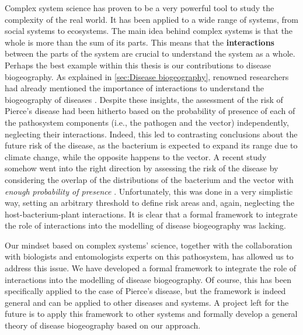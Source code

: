 Complex system science has proven to be a very powerful tool to study the
complexity of the real world. It has been applied to a wide range of systems,
from social systems to ecosystems. The main idea behind complex systems is that
the whole is more than the sum of its parts. This means that the
\textbf{interactions} between the parts of the system are crucial to understand
the system as a whole. Perhaps the best example within this thesis is our
contributions to disease biogeography. As explained in \cref{sec:Disease
    biogeography}, renowned researchers had already mentioned the importance of
interactions to understand the biogeography of diseases \cite{Peterson2008}.
Despite these insights, the assessment of the risk of Pierce's disease had been
hitherto based on the probability of presence of each of the pathosystem
components (i.e., the pathogen and the vector) independently, neglecting their
interactions. Indeed, this led to contrasting conclusions about the future risk
of the disease, as the bacterium is expected to expand its range due to climate
change, while the opposite happens to the vector. A recent study somehow went
into the right direction by assessing the risk of the disease by considering
the overlap of the distributions of the bacterium and the vector with
\textit{enough probability of presence} \cite{YoonLee2023}. Unfortunately, this
was done in a very simplistic way, setting an arbitrary threshold to define
risk areas and, again, neglecting the host-bacterium-plant interactions. It is
clear that a formal framework to integrate the role of interactions into the
modelling of disease biogeography was lacking.

Our mindset based on complex systems' science, together with the collaboration
with biologists and entomologists experts on this pathosystem, has allowed us
to address this issue. We have developed a formal framework to integrate the
role of interactions into the modelling of disease biogeography. Of course,
this has been specifically applied to the case of Pierce's disease, but the
framework is indeed general and can be applied to other diseases and systems.
A project left for the future is to apply this framework to other systems and
formally develop a general theory of disease biogeography based on our
approach.

